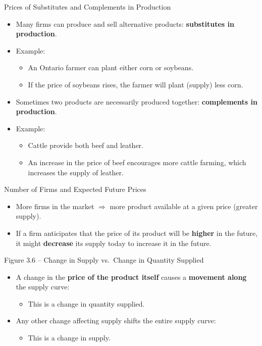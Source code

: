 \documentclass[aspectratio=169]{beamer}
\begin{document}
\begin{frame}{Prices of Substitutes and Complements in Production}
\transfade
\begin{itemize}[<+->]
  \item Many firms can produce and sell alternative products: \textbf{substitutes in production}.
  \item Example:
  \begin{itemize}[<+->]
    \item An Ontario farmer can plant either corn or soybeans.
    \item If the price of soybeans rises, the farmer will plant (supply) less corn.
  \end{itemize}
  \item Sometimes two products are necessarily produced together: \textbf{complements in production}.
  \item Example:
  \begin{itemize}[<+->]
    \item Cattle provide both beef and leather.
    \item An increase in the price of beef encourages more cattle farming, which increases the supply of leather.
  \end{itemize}
\end{itemize}
\end{frame}

\begin{frame}{Number of Firms and Expected Future Prices}
\transfade
\begin{itemize}[<+->]
  \item More firms in the market \(\Rightarrow\) more product available at a given price (greater supply).
  \item If a firm anticipates that the price of its product will be \textbf{higher} in the future, it might \textbf{decrease} its supply today to increase it in the future.
\end{itemize}
\end{frame}

\begin{frame}{Figure 3.6 -- Change in Supply vs.\ Change in Quantity Supplied}
\transfade
\begin{itemize}[<+->]
  \item A change in the \textbf{price of the product itself} causes a \textbf{movement along} the supply curve:
  \begin{itemize}[<+->]
    \item This is a \alert{change in quantity supplied}.
  \end{itemize}
  \item Any other change affecting supply shifts the entire supply curve:
  \begin{itemize}[<+->]
    \item This is a \alert{change in supply}.
  \end{itemize}
\end{itemize}
\end{frame}
\end{document}
